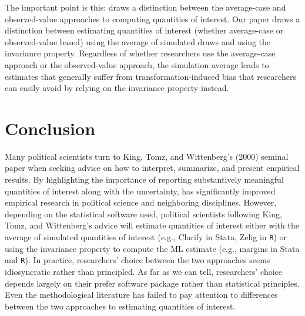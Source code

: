 \documentclass[11pt]{article}
\begin{document}
The important point is this: \cite{HanmerKalkan2013} draws a distinction between the average-case and observed-value approaches to computing
quantities of interest.
Our paper draws a distinction between estimating quantities of interest (whether average-case or observed-value based) using the average of simulated draws and using the invariance property.
Regardless of whether researchers use the average-case approach or the observed-value approach, the simulation average leads to estimates that generally suffer from transformation-induced bias that researchers can easily avoid by relying on the invariance property instead.

\section*{Conclusion}

Many political scientists turn to King, Tomz, and Wittenberg's (2000) seminal paper when seeking advice on how to interpret, summarize, and present empirical results.
By highlighting the importance of reporting substantively meaningful quantities of interest along with the uncertainty, \cite{KingTomzWittenberg2000} has significantly improved empirical research in political science and neighboring disciplines.
However, depending on the statistical software used, political scientists following King, Tomz, and Wittenberg's advice will estimate quantities of interest either with the average of simulated quantities of interest (e.g., Clarify in Stata, Zelig in \texttt{R}) or using the invariance property to compute the ML estimate (e.g., margins in Stata and \texttt{R}).
In practice, researchers' choice between the two approaches seems idiosyncratic rather than principled.
As far as we can tell, researchers' choice depends largely on their prefer software package rather than statistical principles.
Even the methodological literature has failed to pay attention to differences between the two approaches to estimating quantities of interest.
\end{document}
